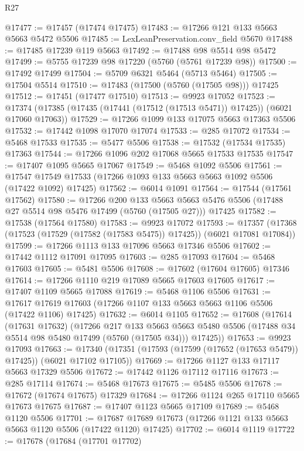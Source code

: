 \begin{lexlean}{R27}
\begin{coremodule}
@17477 := @17457 (@17474 @17475)
@17483 := @17266 @121 @133 @5663 @5663 @5472 @5506
@17485 := LexLeanPreservation.conv_field @5670
@17488 := @17485 @17239 @119 @5663
@17492 := @17488 @98 @5514 @98 @5472
@17499 := @5755 @17239 @98 @17220 (@5760 (@5761 @17239 @98))
@17500 := @17492 @17499
@17504 := @5709 @6321 @5464 (@5713 @5464)
@17505 := @17504 @5514
@17510 := @17483 (@17500 (@5760 (@17505 @98))) @17425
@17512 := @17451 (@17477 @17510)
@17513 := @9923 @17052
@17523 := @17374 (@17385 (@17435 (@17441 (@17512 (@17513 @5471)) @17425)) (@6021 @17060 @17063))
@17529 := @17266 @1099 @133 @17075 @5663 @17363 @5506
@17532 := @17442 @1098 @17070 @17074
@17533 := @285 @17072
@17534 := @5468 @17533
@17535 := @5477 @5506
@17538 := @17532 (@17534 @17535) @17363
@17544 := @17266 @1096 @202 @17068 @5665 @17533 @17535
@17547 := @17407 @1095 @5665 @17067
@17549 := @5468 @1092 @5506
@17561 := @17547 @17549 @17533 (@17266 @1093 @133 @5663 @5663 @1092 @5506 (@17422 @1092) @17425)
@17562 := @6014 @1091
@17564 := @17544 (@17561 @17562)
@17580 := @17266
    @200
    @133
    @5663
    @5663
    @5476
    @5506
    (@17488 @27 @5514 @98 @5476 @17499 (@5760 (@17505 @27)))
    @17425
@17582 := @17538 (@17564 @17580)
@17583 := @9923 @17072
@17593 := @17357 (@17368 (@17523 (@17529 (@17582 (@17583 @5475)) @17425)) (@6021 @17081 @17084))
@17599 := @17266 @1113 @133 @17096 @5663 @17346 @5506
@17602 := @17442 @1112 @17091 @17095
@17603 := @285 @17093
@17604 := @5468 @17603
@17605 := @5481 @5506
@17608 := @17602 (@17604 @17605) @17346
@17614 := @17266 @1110 @219 @17089 @5665 @17603 @17605
@17617 := @17407 @1109 @5665 @17088
@17619 := @5468 @1106 @5506
@17631 := @17617 @17619 @17603 (@17266 @1107 @133 @5663 @5663 @1106 @5506 (@17422 @1106) @17425)
@17632 := @6014 @1105
@17652 := @17608
    (@17614
      (@17631 @17632)
      (@17266
        @217
        @133
        @5663
        @5663
        @5480
        @5506
        (@17488 @34 @5514 @98 @5480 @17499 (@5760 (@17505 @34)))
        @17425))
@17653 := @9923 @17093
@17663 := @17340 (@17351 (@17593 (@17599 (@17652 (@17653 @5479)) @17425)) (@6021 @17102 @17105))
@17669 := @17266 @1127 @133 @17117 @5663 @17329 @5506
@17672 := @17442 @1126 @17112 @17116
@17673 := @285 @17114
@17674 := @5468 @17673
@17675 := @5485 @5506
@17678 := @17672 (@17674 @17675) @17329
@17684 := @17266 @1124 @265 @17110 @5665 @17673 @17675
@17687 := @17407 @1123 @5665 @17109
@17689 := @5468 @1120 @5506
@17701 := @17687 @17689 @17673 (@17266 @1121 @133 @5663 @5663 @1120 @5506 (@17422 @1120) @17425)
@17702 := @6014 @1119
@17722 := @17678
    (@17684
      (@17701 @17702)

\end{coremodule}
\end{lexlean}
